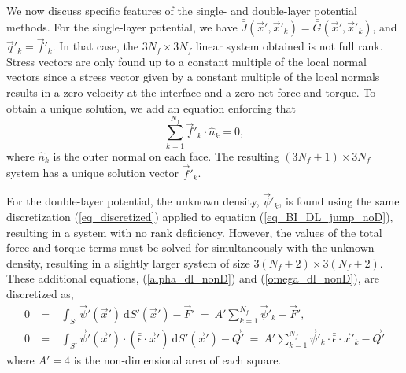  \par
 We now discuss specific features of the single- and  double-layer potential methods. For the single-layer potential, we have $\bar{\bar{J}}(\vec{x}',\vec{x}'_k) = \bar{\bar{G}}(\vec{x}',\vec{x}'_k)$, and $\vec{q}'_k = \vec{f}'_k$. 
 In that case, the $3N_f \times 3N_f$ linear system obtained is not full rank. Stress vectors are only found up to a constant multiple of the local normal vectors since a stress vector given by a constant multiple of the local normals results in a zero velocity at the interface and a zero net force and torque. To obtain a unique solution, we add an equation enforcing that
 \begin{equation}
 \sum_{k=1}^{N_f} \vec{f}'_k \cdot \hat{n}_k = 0,
 \label{eq_constraint}
 \end{equation}
 where $\hat{n}_k$ is the outer normal on each face. The resulting $(3N_f +1)\times 3N_f$ system has a unique solution vector $\vec{f}'_k$. 
 \par
 For the double-layer potential, the unknown density, $\vec{\psi}'_k$, is found using the same discretization (\ref{eq_discretized}) applied to equation (\ref{eq_BI_DL_jump_noD}), resulting in a system with no rank deficiency. However, the values of the total force and torque terms must be solved for simultaneously with the unknown density, resulting in a slightly larger system of size $3(N_f+2)\times 3(N_f+2)$. These additional  equations, (\ref{alpha_dl_nonD}) and (\ref{omega_dl_nonD}), are discretized as,
 \begin{eqnarray}
 0 \ &=& \
 \int_{S'}  \vec{\psi}'( \vec{x}')  \ \text{d}S'(\vec{x}') -  \vec{F}' \ = \
A' \sum_{k=1}^{N_f} \vec{\psi}'_k   -  \vec{F}', \label{eq_disc_dlF} \\
0 \ &=& \
  \int_{S'}  \vec{\psi}' ( \vec{x}') \cdot  (\bar{\bar{\bar{\epsilon}}} \cdot \vec{x}' )  \ \text{d}S'(\vec{x}')
 - \vec{Q}'
\ = \
 A' \sum_{k=1}^{N_f} \vec{\psi}'_k   \cdot \bar{\bar{\bar{\epsilon}}}  \cdot  \vec{x}'_k   - \vec{Q}' \label{eq_disc_dlQ}
 \end{eqnarray}
where $A' = 4$ is the non-dimensional area of each square.
